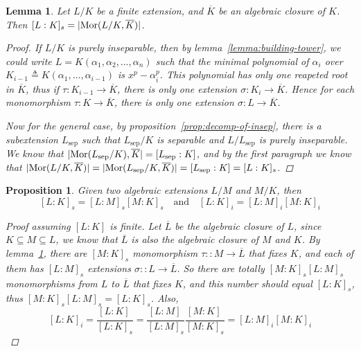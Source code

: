 \documentclass[a4paper]{article}
\DeclarePairedDelimiter{\abs}{\lvert}{\rvert}
\newcommand{\defeq}{\triangleq}
\DeclareMathOperator{\Mor}{Mor}
\theoremstyle{mystyle}
\newtheorem{lemma}{Lemma}
\newtheorem{proposition}{Proposition}
\theoremstyle{remark}
\theoremstyle{definition}
\theoremstyle{definition}
\begin{document}
  \begin{lemma} \label{lemma:number-of-ext-equal-sep-deg}
    Let $L/K$ be a finite extension, and $\overline{K}$ be an algebraic closure of $K$.
    Then $[L: K]_s = \abs{\Mor(L/K, \overline{K})}$.

    \begin{proof}
      If $L/K$ is purely inseparable, then by lemma~\ref{lemma:building-tower}, we could write
      $L = K(\alpha_1, \alpha_2, \dots, \alpha_n)$ such that the minimal polynomial of $\alpha_i$
      over $K_{i-1} \defeq K(\alpha_1, \dots, \alpha_{i-1})$ is $x^p - \alpha_i^p$.
      This polynomial has only one reapeted root in $\overline{K}$, thus if $\tau: K_{i-1} \to \overline{K}$,
      there is only one extension $\sigma: K_i \to \overline{K}$. Hence
      for each monomorphism $\tau: K \to \overline{K}$, there is only one extension $\sigma: L \to \overline{K}$.

      Now for the general case, by proposition~\ref{prop:decomp-of-insep}, there is a subextension
      $L_\text{sep}$ such that $L_\text{sep} / K$ is separable and $L / L_\text{sep}$ is purely inseparable.
      We know that $\abs{\Mor(L_\text{sep}/K), \overline{K}} = [L_\text{sep}: K]$, and by the
      first paragraph we know that $\abs{\Mor(L/K, \overline{K})} = \abs{\Mor(L_\text{sep}/K, \overline{K})}
      = [L_\text{sep}: K] = [L: K]_s$.
    \end{proof}
  \end{lemma}

  \begin{proposition} \label{prop:final-prop}
    Given two algebraic extensions $L/M$ and $M/K$, then
    \[ [L: K]_s = [L: M]_s [M:K]_s \quad \mathrm{and} \quad [L: K]_i = [L: M]_i [M: K]_i \]

    \begin{proof}[Proof assuming \({[L: K]}\) is finite]
      Let $\overline{L}$ be the algebraic closure of $L$, since $K \subseteq M \subseteq L$,
      we know that $\overline{L}$ is also the algebraic closure of $M$ and $K$.
      By lemma~\ref{lemma:number-of-ext-equal-sep-deg}, there are $[M: K]_s$ monomorphism
      $\tau :: M \to \overline{L}$ that fixes $K$, and each of them has $[L: M]_s$ extensions
      $\sigma :: L \to \overline{L}$. So there are totally $[M: K]_s [L: M]_s$ monomorphisms
      from $L$ to $\overline{L}$ that fixes $K$, and this number should equal $[L: K]_s$,
      thus $[M: K]_s [L: M]_s = [L: K]_s$. Also,
      \[ [L: K]_i = \frac{[L: K]_{\ }}{[L: K]_s} = \frac{[L: M]_{\ }}{[L: M]_s}\frac{[M: K]_{\ }}{[M: K]_s} =
        [L: M]_i [M: K]_i \]
    \end{proof}
  \end{proposition}
\end{document}
